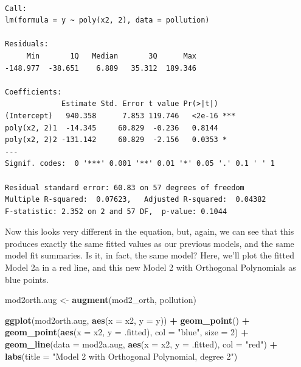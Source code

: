 \documentclass[]{book}
\newenvironment{Shaded}{\begin{snugshade}}{\end{snugshade}}
\newcommand{\KeywordTok}[1]{\textcolor[rgb]{0.13,0.29,0.53}{\textbf{#1}}}
\newcommand{\DataTypeTok}[1]{\textcolor[rgb]{0.13,0.29,0.53}{#1}}
\newcommand{\DecValTok}[1]{\textcolor[rgb]{0.00,0.00,0.81}{#1}}
\newcommand{\StringTok}[1]{\textcolor[rgb]{0.31,0.60,0.02}{#1}}
\newcommand{\OperatorTok}[1]{\textcolor[rgb]{0.81,0.36,0.00}{\textbf{#1}}}
\newcommand{\NormalTok}[1]{#1}
\theoremstyle{definition}
\theoremstyle{definition}
\theoremstyle{definition}
\theoremstyle{remark}
\begin{document}
\begin{verbatim}

Call:
lm(formula = y ~ poly(x2, 2), data = pollution)

Residuals:
     Min       1Q   Median       3Q      Max 
-148.977  -38.651    6.889   35.312  189.346 

Coefficients:
             Estimate Std. Error t value Pr(>|t|)    
(Intercept)   940.358      7.853 119.746   <2e-16 ***
poly(x2, 2)1  -14.345     60.829  -0.236   0.8144    
poly(x2, 2)2 -131.142     60.829  -2.156   0.0353 *  
---
Signif. codes:  0 '***' 0.001 '**' 0.01 '*' 0.05 '.' 0.1 ' ' 1

Residual standard error: 60.83 on 57 degrees of freedom
Multiple R-squared:  0.07623,   Adjusted R-squared:  0.04382 
F-statistic: 2.352 on 2 and 57 DF,  p-value: 0.1044
\end{verbatim}

Now this looks very different in the equation, but, again, we can see
that this produces exactly the same fitted values as our previous
models, and the same model fit summaries. Is it, in fact, the same
model? Here, we'll plot the fitted Model 2a in a red line, and this new
Model 2 with Orthogonal Polynomials as blue points.

\begin{Shaded}
\begin{Highlighting}[]
\NormalTok{mod2orth.aug <-}\StringTok{ }\KeywordTok{augment}\NormalTok{(mod2_orth, pollution)}

\KeywordTok{ggplot}\NormalTok{(mod2orth.aug, }\KeywordTok{aes}\NormalTok{(}\DataTypeTok{x =}\NormalTok{ x2, }\DataTypeTok{y =}\NormalTok{ y)) }\OperatorTok{+}
\StringTok{    }\KeywordTok{geom_point}\NormalTok{() }\OperatorTok{+}
\StringTok{    }\KeywordTok{geom_point}\NormalTok{(}\KeywordTok{aes}\NormalTok{(}\DataTypeTok{x =}\NormalTok{ x2, }\DataTypeTok{y =}\NormalTok{ .fitted), }
               \DataTypeTok{col =} \StringTok{"blue"}\NormalTok{, }\DataTypeTok{size =} \DecValTok{2}\NormalTok{) }\OperatorTok{+}
\StringTok{    }\KeywordTok{geom_line}\NormalTok{(}\DataTypeTok{data =}\NormalTok{ mod2a.aug, }\KeywordTok{aes}\NormalTok{(}\DataTypeTok{x =}\NormalTok{ x2, }\DataTypeTok{y =}\NormalTok{ .fitted),}
              \DataTypeTok{col =} \StringTok{"red"}\NormalTok{) }\OperatorTok{+}
\StringTok{    }\KeywordTok{labs}\NormalTok{(}\DataTypeTok{title =} \StringTok{"Model 2 with Orthogonal Polynomial, degree 2"}\NormalTok{)}
\end{Highlighting}
\end{Shaded}
\end{document}
